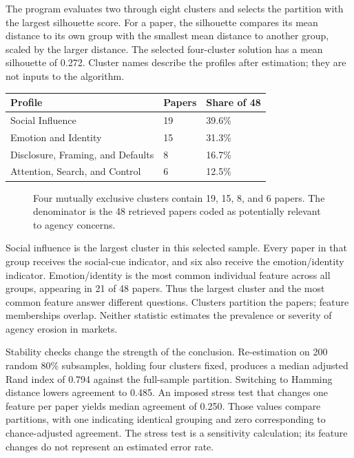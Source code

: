 The program evaluates two through eight clusters and selects the
partition with the largest silhouette score. For a paper, the silhouette
compares its mean distance to its own group with the smallest mean
distance to another group, scaled by the larger distance. The selected
four-cluster solution has a mean silhouette of 0.272. Cluster names
describe the profiles after estimation; they are not inputs to the
algorithm.

\begin{table}[H]
\centering\small
\begin{tabular}{@{}lll@{}}
\toprule
Profile & Papers & Share of 48 \\
\midrule

Social Influence & 19 & 39.6\% \\
Emotion and Identity & 15 & 31.3\% \\
Disclosure, Framing, and Defaults & 8 & 16.7\% \\
Attention, Search, and Control & 6 & 12.5\% \\
\bottomrule
\end{tabular}
\end{table}

\begin{figure}[htbp]
\centering

\caption{Four mutually exclusive clusters contain 19, 15, 8, and 6 papers. The denominator is the 48 retrieved papers coded as potentially relevant to agency concerns.}\label{fig:M04_agency_clusters}
\end{figure}

Social influence is the largest cluster in this selected sample. Every
paper in that group receives the social-cue indicator, and six also
receive the emotion/identity indicator. Emotion/identity is the most
common individual feature across all groups, appearing in 21 of 48
papers. Thus the largest cluster and the most common feature answer
different questions. Clusters partition the papers; feature memberships
overlap. Neither statistic estimates the prevalence or severity of
agency erosion in markets.

Stability checks change the strength of the conclusion. Re-estimation on
200 random 80\% subsamples, holding four clusters fixed, produces a
median adjusted Rand index of 0.794 against the full-sample partition.
Switching to Hamming distance lowers agreement to 0.485. An imposed
stress test that changes one feature per paper yields median agreement
of 0.250. Those values compare partitions, with one indicating identical
grouping and zero corresponding to chance-adjusted agreement. The stress
test is a sensitivity calculation; its feature changes do not represent
an estimated error rate.

